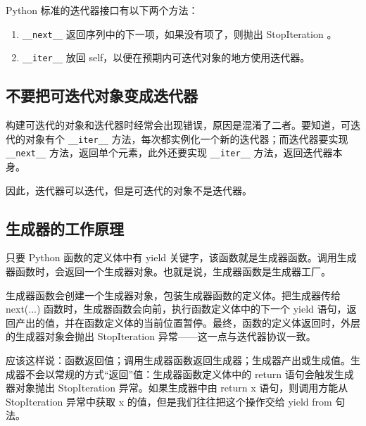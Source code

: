 Python 标准的迭代器接口有以下两个方法：
\begin{enumerate}
    \item \verb|__next__| 返回序列中的下一项，如果没有项了，则抛出 StopIteration 。
    \item \verb|__iter__| 放回 self，以便在预期内可迭代对象的地方使用迭代器。
\end{enumerate}

\subsection{不要把可迭代对象变成迭代器}
构建可迭代的对象和迭代器时经常会出现错误，原因是混淆了二者。要知道，可迭代的对象有个 \verb|__iter__| 方法，每次都实例化一个新的迭代器；而迭代器要实现 \verb|__next__| 方法，返回单个元素，此外还要实现 \verb|__iter__| 方法，返回迭代器本身。

因此，迭代器可以迭代，但是可迭代的对象不是迭代器。

\subsection{生成器的工作原理}
只要 Python 函数的定义体中有 yield 关键字，该函数就是生成器函数。调用生成器函数时，会返回一个生成器对象。也就是说，生成器函数是生成器工厂。

生成器函数会创建一个生成器对象，包装生成器函数的定义体。把生成器传给 next(...) 函数时，生成器函数会向前，执行函数定义体中的下一个 yield 语句，返回产出的值，并在函数定义体的当前位置暂停。最终，函数的定义体返回时，外层的生成器对象会抛出 StopIteration 异常——这一点与迭代器协议一致。


应该这样说：函数返回值；调用生成器函数返回生成器；生成器产出或生成值。生成器不会以常规的方式“返回”值：生成器函数定义体中的 return 语句会触发生成器对象抛出 StopIteration 异常。如果生成器中由 return x 语句，则调用方能从 StopIteration 异常中获取 x 的值，但是我们往往把这个操作交给 yield from 句法。